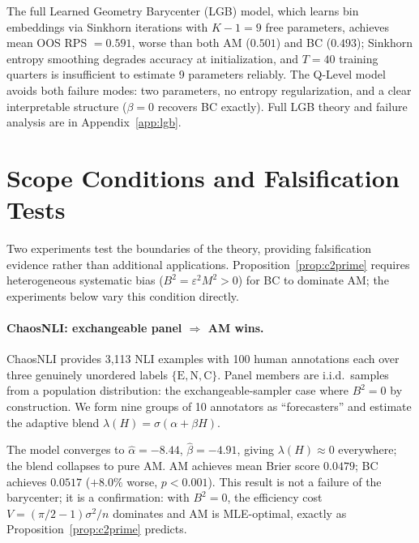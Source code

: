 \begin{remark}
The full Learned Geometry Barycenter (LGB) model, which learns bin embeddings via Sinkhorn iterations with $K-1=9$ free parameters, achieves mean OOS RPS $= 0.591$, worse than both AM ($0.501$) and BC ($0.493$); Sinkhorn entropy smoothing degrades accuracy at initialization, and $T=40$ training quarters is insufficient to estimate 9 parameters reliably.
The Q-Level model avoids both failure modes: two parameters, no entropy regularization, and a clear interpretable structure ($\beta=0$ recovers BC exactly).
Full LGB theory and failure analysis are in Appendix~\ref{app:lgb}.
\end{remark}

\section{Scope Conditions and Falsification Tests}
\label{sec:lgb_extensions}

Two experiments test the boundaries of the theory, providing falsification evidence rather than additional applications.
Proposition~\ref{prop:c2prime} requires heterogeneous systematic bias ($B^2 = \varepsilon^2 M^2 > 0$) for BC to dominate AM; the experiments below vary this condition directly.

\paragraph{ChaosNLI: exchangeable panel $\Rightarrow$ AM wins.}
ChaosNLI \cite{nie2020} provides 3,113 NLI examples with 100 human annotations each over three genuinely unordered labels $\{\text{E}, \text{N}, \text{C}\}$.  Panel members are i.i.d.\ samples from a population distribution: the exchangeable-sampler case where $B^2 = 0$ by construction.  We form nine groups of 10 annotators as ``forecasters'' and estimate the adaptive blend $\lambda(H) = \sigma(\alpha + \beta H)$.

The model converges to $\hat\alpha = -8.44$, $\hat\beta = -4.91$, giving $\lambda(H) \approx 0$ everywhere; the blend collapses to pure AM.  AM achieves mean Brier score $0.0479$; BC achieves $0.0517$ ($+8.0\%$ worse, $p < 0.001$).  This result is not a failure of the barycenter; it is a confirmation: with $B^2 = 0$, the efficiency cost $V = (\pi/2 - 1)\sigma^2/n$ dominates and AM is MLE-optimal, exactly as Proposition~\ref{prop:c2prime} predicts.

